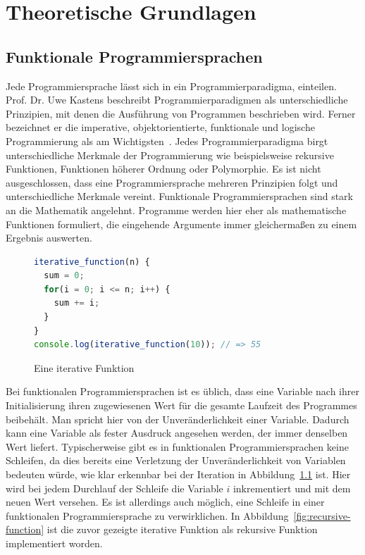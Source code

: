\chapter{Theoretische Grundlagen}
\label{sec:grundlagen}

\section{Funktionale Programmiersprachen}
\label{sec:funktionaleProgrammiersprache}
Jede Programmiersprache lässt sich in ein Programmierparadigma, einteilen.
Prof. Dr. Uwe Kastens beschreibt Programmierparadigmen als \glqq [...] unterschiedliche Prinzipien, mit denen die Ausführung von Programmen beschrieben wird\grqq\cite{definition-programmierparadigmen}.
Ferner bezeichnet er die imperative, objektorientierte, funktionale und logische Programmierung als am Wichtigsten~\cite[Vgl.]{definition-programmierparadigmen}. Jedes Programmierparadigma birgt unterschiedliche Merkmale der Programmierung wie beispielsweise rekursive Funktionen, Funktionen höherer Ordnung oder Polymorphie. Es ist nicht ausgeschlossen, dass eine Programmiersprache mehreren Prinzipien folgt und unterschiedliche Merkmale vereint. Funktionale Programmiersprachen sind stark an die Mathematik angelehnt. Programme werden hier eher als mathematische Funktionen formuliert, die eingehende Argumente immer gleichermaßen zu einem Ergebnis auswerten.
\begin{figure}[h]
\begin{lstlisting}[language=JavaScript]
iterative_function(n) {
  sum = 0;
  for(i = 0; i <= n; i++) {
    sum += i;
  }
}
console.log(iterative_function(10)); // => 55
\end{lstlisting}
\caption{Eine iterative Funktion}\label{fig:iterative-function}
\end{figure}
Bei funktionalen Programmiersprachen ist es üblich, dass eine Variable nach ihrer Initialisierung ihren zugewiesenen Wert für die gesamte Laufzeit des Programmes beibehält. Man spricht hier von der Unveränderlichkeit einer Variable. Dadurch kann eine Variable als fester Ausdruck angesehen werden, der immer denselben Wert liefert.
Typischerweise gibt es in funktionalen Programmiersprachen keine Schleifen, da dies bereits eine Verletzung der Unveränderlichkeit von Variablen bedeuten würde, wie klar erkennbar bei der Iteration in Abbildung~\ref{fig:iterative-function} ist.
Hier wird bei jedem Durchlauf der Schleife die Variable $i$ inkrementiert und mit dem neuen Wert versehen. Es ist allerdings auch möglich, eine Schleife in einer funktionalen Programmiersprache zu verwirklichen. In Abbildung~\ref{fig:recursive-function} ist die zuvor gezeigte iterative Funktion als rekursive Funktion implementiert worden.
